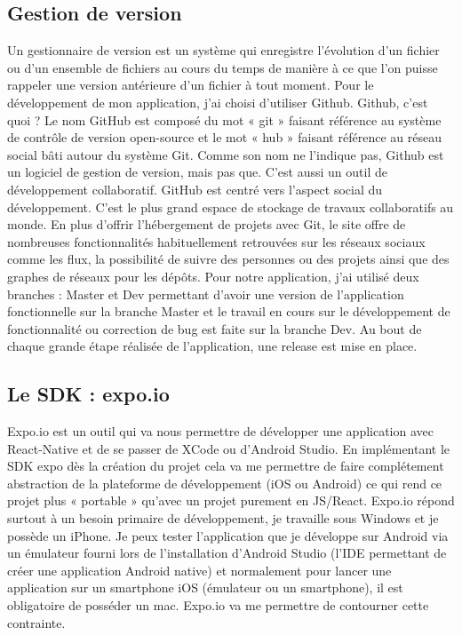 \subsection{Gestion de version}

Un gestionnaire de version est un système qui enregistre l'évolution d'un fichier ou d'un ensemble de fichiers au cours du temps de manière à ce que l’on puisse rappeler une version antérieure d'un fichier à tout moment. Pour le développement de mon application, j'ai choisi d'utiliser Github. Github, c’est quoi ? Le nom GitHub est composé du mot « git » faisant référence au système de contrôle de version open-source et le mot « hub » faisant référence au réseau social bâti autour du système Git. Comme son nom ne l’indique pas, Github est un logiciel de gestion de version, mais pas que. C’est aussi un outil de développement collaboratif. GitHub est centré vers l'aspect social du développement. C’est le plus grand espace de stockage de travaux collaboratifs au monde. En plus d'offrir l'hébergement de projets avec Git, le site offre de nombreuses fonctionnalités habituellement retrouvées sur les réseaux sociaux comme les flux, la possibilité de suivre des personnes ou des projets ainsi que des graphes de réseaux pour les dépôts. Pour notre application, j’ai utilisé deux branches : Master et Dev permettant d’avoir une version de l’application fonctionnelle sur la branche Master et le travail en cours sur le développement de fonctionnalité ou correction de bug est faite sur la branche Dev. Au bout de chaque grande étape réalisée de l’application, une release est mise en place.

\subsection{Le SDK : expo.io}

Expo.io est un outil qui va nous permettre de développer une application avec React-Native et de se passer de XCode ou d’Android Studio. En implémentant le SDK expo dès la création du projet cela va me permettre de faire complétement abstraction de la plateforme de développement (iOS ou Android) ce qui rend ce projet plus « portable » qu’avec un projet purement en JS/React. Expo.io répond surtout à un besoin primaire de développement, je travaille sous Windows et je possède un iPhone. Je peux tester l’application que je développe sur Android via un émulateur fourni lors de l’installation d’Android Studio (l’IDE permettant de créer une application Android native) et normalement pour lancer une application sur un smartphone iOS (émulateur ou un smartphone), il est obligatoire de posséder un mac. Expo.io va me permettre de contourner cette contrainte. 

